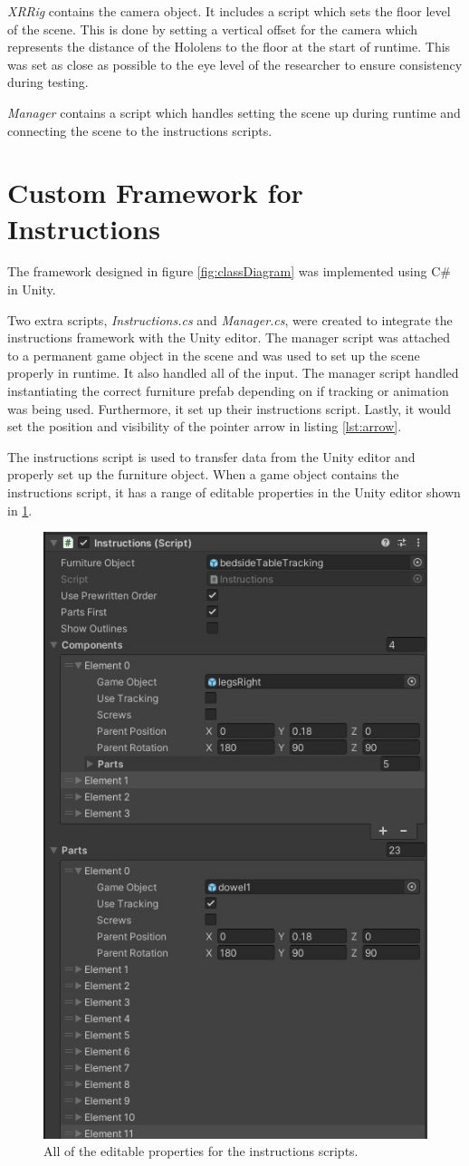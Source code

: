 \documentclass{l4proj}
\begin{document}
\textit{XRRig} contains the camera object. It includes a script which sets the floor level of the scene. This is done by setting a vertical offset for the camera which represents the distance of the Hololens to the floor at the start of runtime. This was set as close as possible to the eye level of the researcher to ensure consistency during testing.

\textit{Manager} contains a script which handles setting the scene up during runtime and connecting the scene to the instructions scripts.

\section{Custom Framework for Instructions}

The framework designed in figure \ref{fig:classDiagram} was implemented using C\# in Unity. 

Two extra scripts, \textit{Instructions.cs} and \textit{Manager.cs}, were created to integrate the instructions framework with the Unity editor. The manager script was attached to a permanent game object in the scene and was used to set up the scene properly in runtime. It also handled all of the input. The manager script handled instantiating the correct furniture prefab depending on if tracking or animation was being used. Furthermore, it set up their instructions script. Lastly, it would set the position and visibility of the pointer arrow in listing \ref{lst:arrow}.

The instructions script is used to transfer data from the Unity editor and properly set up the furniture object. When a game object contains the instructions script, it has a range of editable properties in the Unity editor shown in \ref{fig:properties}.

\begin{figure}[hbt!]
    \centering
    \includegraphics[width=0.4\linewidth]{dissertation//images/instructionsProperties.jpg}
    \caption{All of the editable properties for the instructions scripts.}
    \label{fig:properties}
\end{figure}
\end{document}
